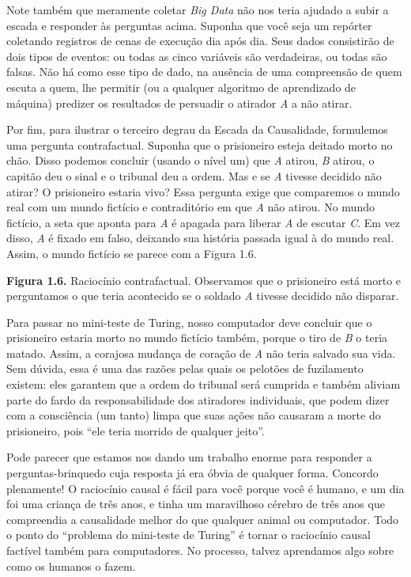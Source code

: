 \documentclass[11pt,a5paper,twoside]{book}
\begin{document}
Note também que meramente coletar \textit{Big Data} não nos teria ajudado a subir a escada e responder às perguntas acima. Suponha que você seja um repórter coletando registros de cenas de execução dia após dia. Seus dados consistirão de dois tipos de eventos: ou todas as cinco variáveis são verdadeiras, ou todas são falsas. Não há como esse tipo de dado, na ausência de uma compreensão de quem escuta a quem, lhe permitir (ou a qualquer algoritmo de aprendizado de máquina) predizer os resultados de persuadir o atirador \textit{A} a não atirar.

Por fim, para ilustrar o terceiro degrau da Escada da Causalidade, formulemos uma pergunta contrafactual. Suponha que o prisioneiro esteja deitado morto no chão. Disso podemos concluir (usando o nível um) que \textit{A} atirou, \textit{B} atirou, o capitão deu o sinal e o tribunal deu a ordem. Mas e se \textit{A} tivesse decidido não atirar? O prisioneiro estaria vivo? Essa pergunta exige que comparemos o mundo real com um mundo fictício e contraditório em que \textit{A} não atirou. No mundo fictício, a seta que aponta para \textit{A} é apagada para liberar \textit{A} de escutar \textit{C}. Em vez disso, \textit{A} é fixado em falso, deixando sua história passada igual à do mundo real. Assim, o mundo fictício se parece com a Figura 1.6.

\textbf{Figura 1.6.} Raciocínio contrafactual. Observamos que o prisioneiro está morto e perguntamos o que teria acontecido se o soldado \textit{A} tivesse decidido não disparar.

Para passar no mini-teste de Turing, nosso computador deve concluir que o prisioneiro estaria morto no mundo fictício também, porque o tiro de \textit{B} o teria matado. Assim, a corajosa mudança de coração de \textit{A} não teria salvado sua vida. Sem dúvida, essa é uma das razões pelas quais os pelotões de fuzilamento existem: eles garantem que a ordem do tribunal será cumprida e também aliviam parte do fardo da responsabilidade dos atiradores individuais, que podem dizer com a consciência (um tanto) limpa que suas ações não causaram a morte do prisioneiro, pois “ele teria morrido de qualquer jeito”.

Pode parecer que estamos nos dando um trabalho enorme para responder a perguntas-brinquedo cuja resposta já era óbvia de qualquer forma. Concordo plenamente! O raciocínio causal é fácil para você porque você é humano, e um dia foi uma criança de três anos, e tinha um maravilhoso cérebro de três anos que compreendia a causalidade melhor do que qualquer animal ou computador. Todo o ponto do “problema do mini-teste de Turing” é tornar o raciocínio causal factível também para computadores. No processo, talvez aprendamos algo sobre como os humanos o fazem.
\end{document}
